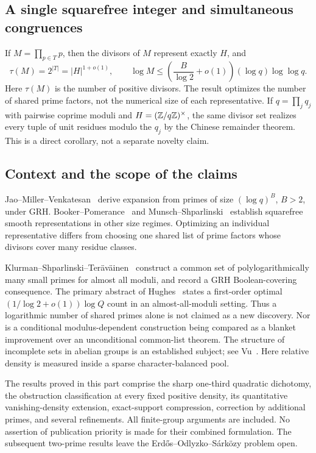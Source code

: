 \documentclass[11pt,a4paper]{article}
\theoremstyle{definition}
\theoremstyle{remark}
\begin{document}
\subsection{A single squarefree integer and simultaneous congruences}
If $M=\prod_{p\in T}p$, then the divisors of $M$ represent exactly $H$,
and
\[
 \tau(M)=2^{|T|}=|H|^{1+o(1)},\qquad
 \log M\le\left(\frac B{\log2}+o(1)\right)
       (\log q)\log\log q.
\]
Here $\tau(M)$ is the number of positive divisors. The result optimizes
the number of shared prime factors, not the numerical size of each
representative. If $q=\prod_j q_j$ with pairwise coprime moduli and
$H=(\mathbb Z/q\mathbb Z)^\times$, the same divisor set realizes every tuple of unit residues
modulo the $q_j$ by the Chinese remainder theorem. This is a direct
corollary, not a separate novelty claim.




\subsection{Context and the scope of the claims}

Jao--Miller--Venkatesan~\cite{p-JMV} derive expansion from primes of
size $(\log q)^B$, $B>2$, under GRH. Booker--Pomerance~\cite{p-BP}
and Munsch--Shparlinski~\cite{p-MS} establish squarefree smooth
representations in other size regimes. Optimizing an individual
representative differs from choosing one shared list of prime factors
whose divisors cover many residue classes.

Klurman--Shparlinski--Ter\"av\"ainen~\cite{p-KST} construct a common
set of polylogarithmically many small primes for almost all moduli,
and record a GRH Boolean-covering consequence. The primary abstract
of Hughes~\cite{p-Hughes} states a first-order optimal
$(1/\log2+o(1))\log Q$ count in an almost-all-moduli setting.
Thus a logarithmic number of shared primes alone is not claimed as
a new discovery. Nor is a conditional modulus-dependent construction
being compared as a blanket improvement over an unconditional
common-list theorem. The structure of incomplete sets in abelian
groups is an established subject; see Vu~\cite{p-Vu}. Here relative
density is measured inside a sparse character-balanced pool.

The results proved in this part comprise the sharp one-third
quadratic dichotomy, the obstruction classification at every fixed
positive density, its quantitative vanishing-density extension,
exact-support compression, correction by additional primes, and
several refinements. All finite-group arguments are included.
No assertion of publication priority is made for their combined
formulation. The subsequent two-prime results leave the
Erd\H{o}s--Odlyzko--S\'ark\"ozy problem open.
\end{document}

